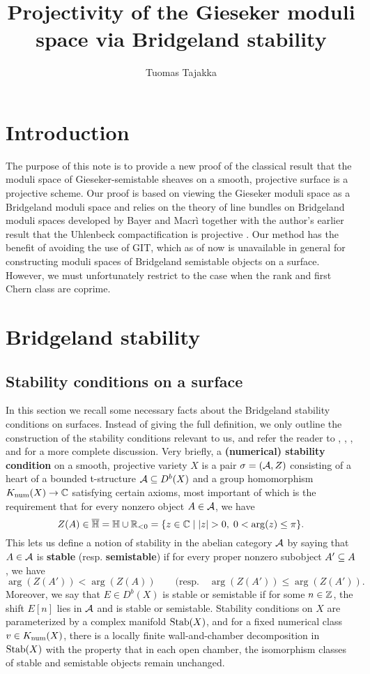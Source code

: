 \documentclass[letterpaper,12pt]{amsart}
\title{Projectivity of the Gieseker moduli space via Bridgeland stability}
\author{Tuomas Tajakka}
\date{}
\theoremstyle{remark}
\begin{document}
\maketitle

\section{Introduction}
The purpose of this note is to provide a new proof of the classical result that the moduli space of Gieseker-semistable sheaves on a smooth, projective surface is a projective scheme. Our proof is based on viewing the Gieseker moduli space as a Bridgeland moduli space and relies on the theory of line bundles on Bridgeland moduli spaces developed by Bayer and Macr\`i \cite{BM} together with the author's earlier result that the Uhlenbeck compactification is projective \cite{t}. Our method has the benefit of avoiding the use of GIT, which as of now is unavailable in general for constructing moduli spaces of Bridgeland semistable objects on a surface. However, we must unfortunately restrict to the case when the rank and first Chern class are coprime.

\section{Bridgeland stability}
\subsection{Stability conditions on a surface}
In this section we recall some necessary facts about the Bridgeland stability conditions on surfaces. Instead of giving the full definition, we only outline the construction of the stability conditions relevant to us, and refer the reader to \cite{bridgeland}, \cite{bridgelandK3}, \cite{ABL13}, and \cite{MS} for a more complete discussion. Very briefly, a \textbf{(numerical) stability condition} on a smooth, projective variety $X$ is a pair $\sigma = (\mathcal{A}, Z)$ consisting of a heart of a bounded t-structure $\mathcal{A} \subseteq D^b(X)$ and a group homomorphism $K_{\mathrm{num}}(X) \to \mathbb{C}$ satisfying certain axioms, most important of which is the requirement that for every nonzero object $A \in \mathcal{A}$, we have
\[ Z(A) \in \overline{\mathbb{H}} = \mathbb{H} \cup \mathbb{R}_{<0} = \{ z \in \mathbb{C} \;|\; |z| > 0, \; 0 < \arg(z) \le \pi \}. \]
This lets us define a notion of stability in the abelian category $\mathcal{A}$ by saying that $A \in \mathcal{A}$ is \textbf{stable} (resp. \textbf{semistable}) if for every proper nonzero subobject $A' \subseteq A$, we have
\[ \arg(Z(A')) < \arg(Z(A)) \qquad (\mathrm{resp.} \quad \arg(Z(A')) \leq \arg(Z(A')). \]
Moreover, we say that $E \in D^b(X)$ is stable or semistable if for some $n \in \mathbb{Z}$, the shift $E[n]$ lies in $\mathcal{A}$ and is stable or semistable. Stability conditions on $X$ are parameterized by a complex manifold $\operatorname{\mathrm{Stab}}(X)$, and for a fixed numerical class $v \in K_{\mathrm{num}}(X)$, there is a locally finite wall-and-chamber decomposition in $\operatorname{\mathrm{Stab}}(X)$ with the property that in each open chamber, the isomorphism classes of stable and semistable objects remain unchanged.
\end{document}
